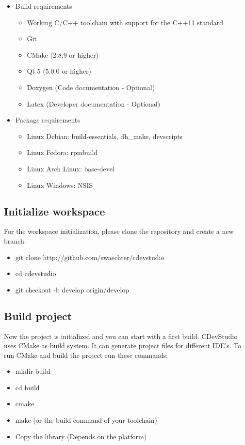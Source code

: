 \documentclass{article}
\begin{document}
\begin{itemize}
	\item Build requirements
	\begin{itemize}
		\item Working C/C++ toolchain with support for the C++11 standard
		\item Git
		\item CMake (2.8.9 or higher)
		\item Qt 5 (5.0.0 or higher)
		\item Doxygen (Code documentation - Optional)
		\item Latex (Developer documentation - Optional)
	\end{itemize}
	\item Package requirements
	\begin{itemize}
		\item Linux Debian: build-essentials, dh_make, devscripts
		\item Linux Fedora: rpmbuild
		\item Linux Arch Linux: base-devel
		\item Linux Windows: NSIS
	\end{itemize}
\end{itemize}

\subsection{Initialize workspace}
For the workspace initialization, please clone the repository and create a new branch:

\begin{itemize}
	\item git clone http://github.com/swaechter/cdevstudio
	\item cd cdevstudio
	\item git checkout -b develop origin/develop
\end{itemize}

\subsection{Build project}
Now the project is initialized and you can start with a first build. CDevStudio uses CMake as build system. It can generate project files for different IDE's. To run CMake and build the project run these commands:

\begin{itemize}
	\item mkdir build
	\item cd build
	\item cmake ..
	\item make (or the build command of your toolchain)
	\item Copy the library (Depends on the platform)
\end{itemize}
\end{document}
